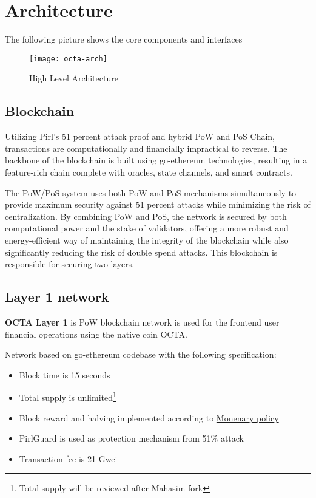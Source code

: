 \section{Architecture}

The following picture shows the core components and interfaces

\begin{figure}[h]
    \centering
    \texttt{[image: octa-arch]}
    \caption{High Level Architecture}
\end{figure}

\subsection{Blockchain}

Utilizing Pirl's 51 percent attack proof and hybrid PoW and PoS Chain, transactions are computationally and financially impractical to reverse. The backbone of the blockchain is built using go-ethereum technologies, resulting in a feature-rich chain complete with oracles, state channels, and smart contracts.

The PoW/PoS system uses both PoW and PoS mechanisms simultaneously to provide maximum security against 51 percent attacks while minimizing the risk of centralization. By combining PoW and PoS, the network is secured by both computational power and the stake of validators, offering a more robust and energy-efficient way of maintaining the integrity of the blockchain while also significantly reducing the risk of double spend attacks. This blockchain is responsible for securing two layers.

\subsection{Layer 1 network}

\textbf{OCTA Layer 1} is PoW\cite{pow} blockchain network is used for the frontend user financial operations using the native coin OCTA.

Network based on go-ethereum\cite{go-ethereum} codebase with the following specification:

\begin{itemize}
    \item Block time is 15 seconds
    \item Total supply is unlimited\footnote{Total supply will be reviewed after Mahasim fork}
    \item Block reward and halving implemented according to \hyperref[sec:mp]{Monenary policy}
    \item PirlGuard is used as protection mechanism from 51\% attack
    \item Transaction fee is 21 Gwei
\end{itemize}

